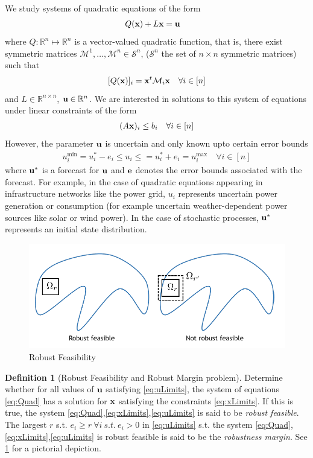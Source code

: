 \documentclass[11pt]{article}
\theoremstyle{plain}
\theoremstyle{definition}
\newtheorem{cdef}{Definition}[section]
\theoremstyle{remark}
\newcommand{\sym}[1]{\mathcal{S}^{#1}}
\begin{document}
We study systems of quadratic equations of the form
\begin{align}
& Q(\bold x)+L\bold x=\bold u\label{eq:Quad}
\end{align}
where $Q: \mathbb{R}^n \mapsto \mathbb{R}^n$ is a vector-valued quadratic function, that is, there exist symmetric matrices $\mathcal{M}^1,\ldots,\mathcal{M}^{n} \in \sym{n}$, ($\sym{n}$ the set of $n \times n$ symmetric matrices) such that
\[[Q(\bold x)]_i = \bold x^t \mathcal{M}_{i} \bold x \quad \forall i \in [n]\]
and $L \in \mathbb{R}^{n\times n}$, $\bold u \in \mathbb{R}^n$. 
We are interested in solutions to this system of equations under linear constraints of the form
\begin{align}
(A\bold x)_i\leq b_i \quad \forall i \in [n]\label{eq:xLimits}
\end{align}
However, the parameter $\bold u$ is uncertain and only known upto certain error bounds
\begin{align}
u^{\min}_i=u_i^*-e_i \leq u_i \leq =u_i^*+e_i=u^{\max}_i \quad \forall i \in [n] \label{eq:uLimits}
\end{align}
where $\bold u^*$ is a forecast for $\bold u$ and $\bold e$ denotes the error bounds associated with the forecast. 
For example, in the case of quadratic equations appearing in infrastructure networks like the power grid, $u_i$ represents uncertain power generation or consumption (for example uncertain weather-dependent power sources like solar or wind power). 
In the case of stochastic processes, $\bold u^*$ represents an initial state distribution.

\begin{figure}
\begin{center}
\includegraphics[scale=0.5]{Figures/Rfeas}
\end{center}
\caption{Robust Feasibility}
\label{fig:RFeas}
\end{figure}

\begin{cdef}[Robust Feasibility and Robust Margin problem]
\label{RobustDef}
Determine whether for all values of $\bold u$ satisfying \eqref{eq:uLimits}, the system of equations \eqref{eq:Quad} has a solution for $\bold x$ satisfying the constraints \eqref{eq:xLimits}. 
If this is true, the system \eqref{eq:Quad},\eqref{eq:xLimits},\eqref{eq:uLimits} is said to be \emph{robust feasible}. 
The largest $r$ s.t. $e_i\geq r \ \forall i \ s.t. \ e_i>0$ in \eqref{eq:uLimits} s.t. the system \eqref{eq:Quad},\eqref{eq:xLimits},\eqref{eq:uLimits} is robust feasible is said to be the \emph{robustness margin}. 
See \cref{fig:RFeas} for a pictorial depiction. 
\end{cdef}
\end{document}
